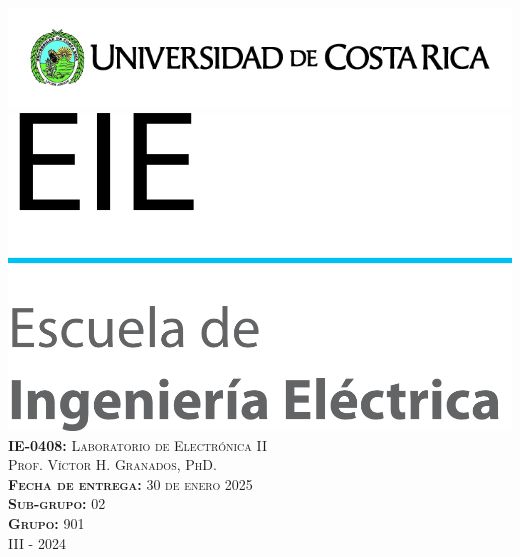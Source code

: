 \begin{titlepage}

\newcommand{\HRule}{\rule{\linewidth}{0.5mm}} %

\center %
 

\includegraphics[scale=.5]{figs/portada/UCR_logo.jpg}\\[1.5cm] %
\includegraphics[scale=2.4]{figs/portada/EIE_logo.png}\\[1.5cm] %
\textsc{\Large \textbf{IE-0408:} Laboratorio de Electrónica II}\\[.5cm] %
\textsc{\large Prof. Víctor H. Granados, PhD.}\\[.5cm]
\textsc{\large \textbf{Fecha de entrega:} 30
de enero 2025}\\[.5cm] 
\textsc{\large \textbf{Sub-grupo:} 02}\\[.5cm]
\textsc{\large \textbf{Grupo:} 901}\\[.5cm]
\textsc{\large III - 2024}\\[1cm]


\end{titlepage}
